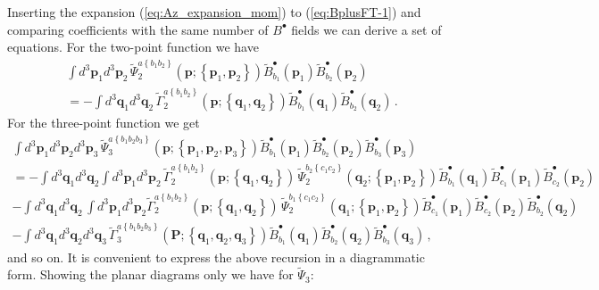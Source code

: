 \documentclass[english,american]{article}
\begin{document}
Inserting the expansion (\ref{eq:Az_expansion_mom}) to (\ref{eq:BplusFT-1})
and comparing coefficients with the same number of $B^{\bullet}$
fields we can derive a set of equations. For the two-point function
we have
\begin{multline}
\int d^{3}\mathbf{p}_{1}d^{3}\mathbf{p}_{2}\,\tilde{\Psi}_{2}^{a\left\{ b_{1}b_{2}\right\} }\left(\mathbf{p};\left\{ \mathbf{p}_{1},\mathbf{p}_{2}\right\} \right)\tilde{B}_{b_{1}}^{\bullet}\left(\mathbf{p}_{1}\right)\tilde{B}_{b_{2}}^{\bullet}\left(\mathbf{p}_{2}\right)\\
=-\int d^{3}\mathbf{q}_{1}d^{3}\mathbf{q}_{2}\,\tilde{\Gamma}_{2}^{a\left\{ b_{1}b_{2}\right\} }\left(\mathbf{p};\left\{ \mathbf{q}_{1},\mathbf{q}_{2}\right\} \right)\tilde{B}_{b_{1}}^{\bullet}\left(\mathbf{q}_{1}\right)\tilde{B}_{b_{2}}^{\bullet}\left(\mathbf{q}_{2}\right)\,.
\end{multline}
For the three-point function we get
\begin{multline}
\int d^{3}\mathbf{p}_{1}d^{3}\mathbf{p}_{2}d^{3}\mathbf{p}_{3}\,\tilde{\Psi}_{3}^{a\left\{ b_{1}b_{2}b_{3}\right\} }\left(\mathbf{p};\left\{ \mathbf{p}_{1},\mathbf{p}_{2},\mathbf{p}_{3}\right\} \right)\tilde{B}_{b_{1}}^{\bullet}\left(\mathbf{p}_{1}\right)\tilde{B}_{b_{2}}^{\bullet}\left(\mathbf{p}_{2}\right)\tilde{B}_{b_{3}}^{\bullet}\left(\mathbf{p}_{3}\right)\\
=-\int d^{3}\mathbf{q}_{1}d^{3}\mathbf{q}_{2}\int d^{3}\mathbf{p}_{1}d^{3}\mathbf{p}_{2}\,\tilde{\Gamma}_{2}^{a\left\{ b_{1}b_{2}\right\} }\left(\mathbf{p};\left\{ \mathbf{q}_{1},\mathbf{q}_{2}\right\} \right)\,\tilde{\Psi}_{2}^{b_{2}\left\{ c_{1}c_{2}\right\} }\left(\mathbf{q}_{2};\left\{ \mathbf{p}_{1},\mathbf{p}_{2}\right\} \right)\tilde{B}_{b_{1}}^{\bullet}\left(\mathbf{q}_{1}\right)\tilde{B}_{c_{1}}^{\bullet}\left(\mathbf{p}_{1}\right)\tilde{B}_{c_{2}}^{\bullet}\left(\mathbf{p}_{2}\right)\\
-\int d^{3}\mathbf{q}_{1}d^{3}\mathbf{q}_{2}\,\int d^{3}\mathbf{p}_{1}d^{3}\mathbf{p}_{2}\tilde{\Gamma}_{2}^{a\left\{ b_{1}b_{2}\right\} }\left(\mathbf{p};\left\{ \mathbf{q}_{1},\mathbf{q}_{2}\right\} \right)\,\tilde{\Psi}_{2}^{b_{1}\left\{ c_{1}c_{2}\right\} }\left(\mathbf{q}_{1};\left\{ \mathbf{p}_{1},\mathbf{p}_{2}\right\} \right)\tilde{B}_{c_{1}}^{\bullet}\left(\mathbf{p}_{1}\right)\tilde{B}_{c_{2}}^{\bullet}\left(\mathbf{p}_{2}\right)\tilde{B}_{b_{2}}^{\bullet}\left(\mathbf{q}_{2}\right)\\
-\int d^{3}\mathbf{q}_{1}d^{3}\mathbf{q}_{2}d^{3}\mathbf{q}_{3}\,\tilde{\Gamma}_{3}^{a\left\{ b_{1}b_{2}b_{3}\right\} }\left(\mathbf{P};\left\{ \mathbf{q}_{1},\mathbf{q}_{2},\mathbf{q}_{3}\right\} \right)\tilde{B}_{b_{1}}^{\bullet}\left(\mathbf{q}_{1}\right)\tilde{B}_{b_{2}}^{\bullet}\left(\mathbf{q}_{2}\right)\tilde{B}_{b_{3}}^{\bullet}\left(\mathbf{q}_{3}\right)\,,
\end{multline}
and so on. It is convenient to express the above recursion in a diagrammatic
form. Showing the planar diagrams only we have for $\tilde{\Psi}_{3}$:
\end{document}
